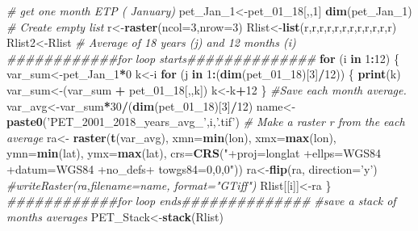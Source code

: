 \documentclass[
  10pt,
  b5paper,
]{book}
\newenvironment{Shaded}{\begin{snugshade}}{\end{snugshade}}
\newcommand{\CommentTok}[1]{\textcolor[rgb]{0.56,0.35,0.01}{\textit{#1}}}
\newcommand{\ControlFlowTok}[1]{\textcolor[rgb]{0.13,0.29,0.53}{\textbf{#1}}}
\newcommand{\DataTypeTok}[1]{\textcolor[rgb]{0.13,0.29,0.53}{#1}}
\newcommand{\DecValTok}[1]{\textcolor[rgb]{0.00,0.00,0.81}{#1}}
\newcommand{\KeywordTok}[1]{\textcolor[rgb]{0.13,0.29,0.53}{\textbf{#1}}}
\newcommand{\NormalTok}[1]{#1}
\newcommand{\OperatorTok}[1]{\textcolor[rgb]{0.81,0.36,0.00}{\textbf{#1}}}
\newcommand{\StringTok}[1]{\textcolor[rgb]{0.31,0.60,0.02}{#1}}
\begin{document}
\begin{Shaded}
\begin{Highlighting}[]
\CommentTok{# get one month ETP ( January)}
\NormalTok{ pet_Jan_}\DecValTok{1}\NormalTok{<-pet_}\DecValTok{01}\NormalTok{_}\DecValTok{18}\NormalTok{[,,}\DecValTok{1}\NormalTok{]}
 \KeywordTok{dim}\NormalTok{(pet_Jan_}\DecValTok{1}\NormalTok{)}
 \CommentTok{# Create empty list}
\NormalTok{r<-}\KeywordTok{raster}\NormalTok{(}\DataTypeTok{ncol=}\DecValTok{3}\NormalTok{,}\DataTypeTok{nrow=}\DecValTok{3}\NormalTok{)}
\NormalTok{Rlist<-}\KeywordTok{list}\NormalTok{(r,r,r,r,r,r,r,r,r,r,r,r)}
\NormalTok{Rlist2<-Rlist}
 \CommentTok{# Average of 18 years (j)  and 12 months (i) }
\CommentTok{############for loop starts##############}
 \ControlFlowTok{for}\NormalTok{ (i }\ControlFlowTok{in} \DecValTok{1}\OperatorTok{:}\DecValTok{12}\NormalTok{) \{ }
\NormalTok{var_sum<-pet_Jan_}\DecValTok{1}\OperatorTok{*}\DecValTok{0}
\NormalTok{k<-i}
 \ControlFlowTok{for}\NormalTok{ (j }\ControlFlowTok{in} \DecValTok{1}\OperatorTok{:}\NormalTok{(}\KeywordTok{dim}\NormalTok{(pet_}\DecValTok{01}\NormalTok{_}\DecValTok{18}\NormalTok{)[}\DecValTok{3}\NormalTok{]}\OperatorTok{/}\DecValTok{12}\NormalTok{)) \{}
\KeywordTok{print}\NormalTok{(k)}
\NormalTok{var_sum<-(var_sum }\OperatorTok{+}\StringTok{ }\NormalTok{pet_}\DecValTok{01}\NormalTok{_}\DecValTok{18}\NormalTok{[,,k])}
\NormalTok{ k<-k}\OperatorTok{+}\DecValTok{12}
\NormalTok{ \}}
\CommentTok{#Save each month average. }
\NormalTok{ var_avg<-var_sum}\OperatorTok{*}\DecValTok{30}\OperatorTok{/}\NormalTok{(}\KeywordTok{dim}\NormalTok{(pet_}\DecValTok{01}\NormalTok{_}\DecValTok{18}\NormalTok{)[}\DecValTok{3}\NormalTok{]}\OperatorTok{/}\DecValTok{12}\NormalTok{)}
\NormalTok{name<-}\KeywordTok{paste0}\NormalTok{(}\StringTok{'PET_2001_2018_years_avg_'}\NormalTok{,i,}\StringTok{'.tif'}\NormalTok{)}
 \CommentTok{# Make a raster r from the each average}
\NormalTok{ra<-}\StringTok{ }\KeywordTok{raster}\NormalTok{(}\KeywordTok{t}\NormalTok{(var_avg), }\DataTypeTok{xmn=}\KeywordTok{min}\NormalTok{(lon), }\DataTypeTok{xmx=}\KeywordTok{max}\NormalTok{(lon), }\DataTypeTok{ymn=}\KeywordTok{min}\NormalTok{(lat), }\DataTypeTok{ymx=}\KeywordTok{max}\NormalTok{(lat), }\DataTypeTok{crs=}\KeywordTok{CRS}\NormalTok{(}\StringTok{"+proj=longlat +ellps=WGS84 +datum=WGS84 +no_defs+ towgs84=0,0,0"}\NormalTok{))}
\NormalTok{ra<-}\KeywordTok{flip}\NormalTok{(ra, }\DataTypeTok{direction=}\StringTok{'y'}\NormalTok{)}
\CommentTok{#writeRaster(ra,filename=name, format="GTiff")}
\NormalTok{Rlist[[i]]<-ra}
\NormalTok{\}}
\CommentTok{############for loop ends##############}
 \CommentTok{#save a stack of months averages}
\NormalTok{ PET_Stack<-}\KeywordTok{stack}\NormalTok{(Rlist)}

\end{Highlighting}
\end{Shaded}
\end{document}
